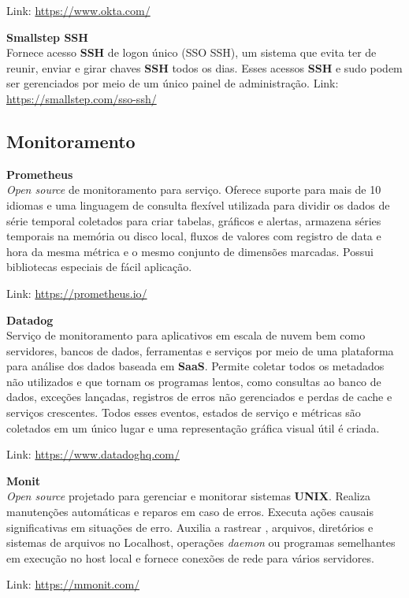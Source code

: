 \documentclass[fleqn,10pt]{../sty/SelfArx} %
\begin{document}
Link: \url{https://www.okta.com/}

\textbf{Smallstep SSH} \\
Fornece acesso \textbf{SSH} de logon único (SSO SSH), um sistema que evita ter de reunir, enviar e girar chaves \textbf{SSH} todos os dias. Esses acessos \textbf{SSH} e sudo podem ser gerenciados por meio de um único painel de administração.
Link: \url{https://smallstep.com/sso-ssh/}

\subsection*{Monitoramento}

\textbf{Prometheus} \\
\textit{Open source} de monitoramento para serviço. Oferece suporte para mais de 10 idiomas e uma linguagem de consulta flexível utilizada para dividir os dados de série temporal coletados para criar tabelas, gráficos e alertas, armazena séries temporais na memória ou disco local, fluxos de valores com registro de data e hora da mesma métrica e o mesmo conjunto de dimensões marcadas. Possui bibliotecas especiais de fácil aplicação.

Link: \url{https://prometheus.io/}

\textbf{Datadog} \\
Serviço de monitoramento para aplicativos em escala de nuvem bem como servidores, bancos de dados, ferramentas e serviços por meio de uma plataforma para análise dos dados baseada em \textbf{SaaS}. Permite coletar todos os metadados não utilizados e que tornam os programas lentos, como consultas ao banco de dados, exceções lançadas, registros de erros não gerenciados e perdas de cache e serviços crescentes. Todos esses eventos, estados de serviço e métricas são coletados em um único lugar e uma representação gráfica visual útil é criada.

Link: \url{https://www.datadoghq.com/}

\textbf{Monit} \\
\textit{Open source} projetado para gerenciar e monitorar sistemas \textbf{UNIX}. Realiza manutenções automáticas e reparos em caso de erros. Executa ações causais significativas em situações de erro. Auxilia a rastrear , arquivos, diretórios e sistemas de arquivos no Localhost, operações \textit{daemon} ou programas semelhantes em execução no host local e fornece conexões de rede para vários servidores.

Link: \url{https://mmonit.com/}
\end{document}
